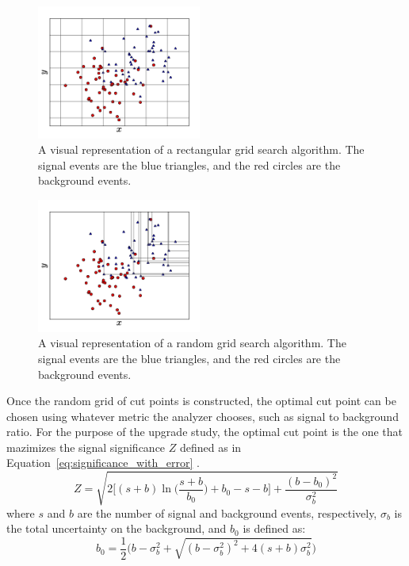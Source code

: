 \begin{figure}[htp]
  \centering
  \includegraphics[width=0.48\textwidth]{figs/ssww_upgrade/rgs/figures_cuts_regulargrid}
  \caption{A visual representation of a rectangular grid search algorithm.  The signal events are the blue triangles, and the red circles are the background events. }   
  \label{fig:rgs_square_grid}
\end{figure}

\begin{figure}[htp]
  \centering
  \includegraphics[width=0.48\textwidth]{figs/ssww_upgrade/rgs/figures_cuts_randomgrid}
  \caption{A visual representation of a random grid search algorithm.  The signal events are the blue triangles, and the red circles are the background events.  }   
  \label{fig:rgs_random_grid}
\end{figure}

Once the random grid of cut points is constructed, the optimal cut point can be chosen using whatever metric the analyzer chooses, such as signal to background ratio.
For the purpose of the \ssww upgrade study, the optimal cut point is the one that mazimizes the signal significance $Z$ defined as in Equation~\ref{eq:significance_with_error} \cite{2011.asimov-significance}.
\begin{equation}
Z = \sqrt{2{\bigg[}(s+b)\ln{\Big(}\frac{s+b}{b_0}{\Big)}+b_0-s-b{\bigg]}+\frac{(b-b_0)^2}{\sigma_b^2}}
\label{eq:significance_with_error}
\end{equation}
where $s$ and $b$ are the number of signal and background events, respectively, $\sigma_b$ is the total uncertainty on the background, and $b_0$ is defined as:
\begin{equation}
b_0 = \frac{1}{2}{\Big(}b-\sigma_b^2+\sqrt{(b-\sigma_b^2)^2+4(s+b)\sigma_b^2}{\Big)}
\label{eq:significance_b0}
\end{equation}


